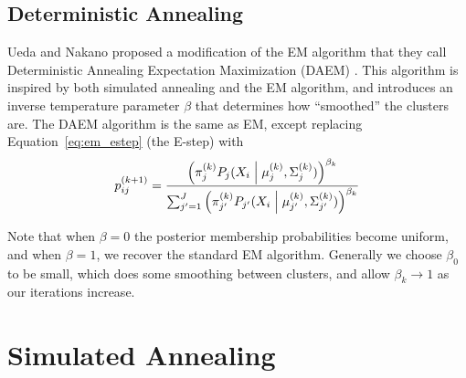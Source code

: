 \documentclass{article}
\newcommand*{\cond}{\;\ifnum\currentgrouptype=16 \middle\fi|\;}
\theoremstyle{definition}
\theoremstyle{algodesc}
\begin{document}
\subsection{Deterministic Annealing}

Ueda and Nakano proposed a modification of the EM algorithm that they call Deterministic Annealing Expectation Maximization (DAEM) \cite{uedanakano98}. This algorithm is inspired by both simulated annealing and the EM algorithm, and introduces an inverse temperature parameter $\beta$ that determines how ``smoothed'' the clusters are. The DAEM algorithm is the same as EM, except replacing Equation~\ref{eq:em_estep} (the E-step) with
  \begin{equation} \label{eq:da_estep}
  p_{ij}^{(k+1)}
    = \frac{\left( \pi_j^{(k)} P_j(X_i \cond \mu_j^{(k)}, \Sigma_j^{(k)}) \right)^{\beta_k}}{\sum_{j'=1}^J \left( \pi_{j'}^{(k)} P_{j'}(X_i \cond \mu_{j'}^{(k)}, \Sigma_{j'}^{(k)}) \right)^{\beta_k}}
  \end{equation}

Note that when $\beta = 0$ the posterior membership probabilities become uniform, and when $\beta = 1$, we recover the standard EM algorithm. Generally we choose $\beta_0$ to be small, which does some smoothing between clusters, and allow $\beta_k \to 1$ as our iterations increase.



\section{Simulated Annealing} \label{sec:simanneal}
\end{document}

